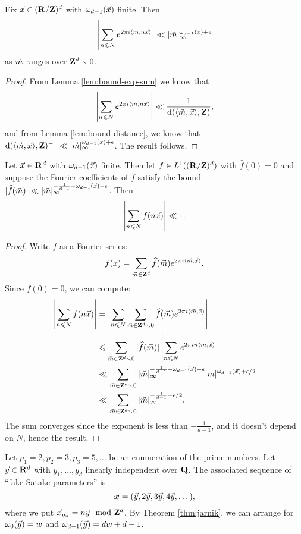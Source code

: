 \begin{theorem}
Fix $\vec{x}\in (\mathbf{R}/\mathbf{Z})^d$ with $\omega_{d-1}(\vec{x})$ finite. Then 
\[
	\left| \sum_{n\leqslant N} e^{2\pi i \langle \vec{m}, n \vec{x}\rangle}\right| \ll |\vec{m}|_\infty^{\omega_{d-1}(\vec{x}) + \epsilon} 
\]
as $\vec{m}$ ranges over $\mathbf{Z}^d\smallsetminus 0$. 
\end{theorem}
\begin{proof}
From Lemma \ref{lem:bound-exp-sum} we know that 
\[
	\left| \sum_{n\leqslant N} e^{2\pi i \langle \vec{m}, n \vec{x}\rangle}\right| \ll \frac{1}{\mathrm{d}(\langle \vec{m}, \vec{x}\rangle,\mathbf{Z})} ,
\]
and from Lemma \ref{lem:bound-distance}, we know that 
$\mathrm{d}(\langle \vec{m},\vec{x}\rangle, \mathbf{Z})^{-1} \ll |\vec{m}|_\infty^{\omega_{d-1}(x)+\epsilon}$. 
The result follows. 
\end{proof}

\begin{theorem}
Let $\vec{x}\in \mathbf{R}^d$ with $\omega_{d-1}(\vec{x})$ finite. Then let 
$f\in L^1((\mathbf{R}/\mathbf{Z})^d)$ with $\widehat f(0)=0$ and suppose the Fourier 
coefficients of $f$ satisfy the bound 
$|\widehat f(\vec{m})| \ll |\vec{m}|_\infty^{-\frac{1}{d-1} - \omega_{d-1}(\vec{x})-\epsilon}$. 
Then 
\[
	\left| \sum_{n\leqslant N} f(n \vec{x})\right| \ll 1. 
\]
\end{theorem}
\begin{proof}
Write $f$ as a Fourier series:
\[
	f(x) = \sum_{\vec{m}\in \mathbf{Z}^d} \widehat f(\vec{m}) e^{2\pi i \langle \vec{m},\vec{x}\rangle} .
\]
Since $\widehat f(0)=0$, we can compute:
\begin{align*}
	\left| \sum_{n\leqslant N} f(n \vec{x})\right| 
		&= \left| \sum_{n\leqslant N} \sum_{\vec{m}\in \mathbf{Z}^d\smallsetminus 0} \widehat f(\vec{m}) e^{2\pi i \langle \vec{m},\vec{x}\rangle}\right| \\
		&\leqslant \sum_{\vec{m}\in \mathbf{Z}^d\smallsetminus 0} |\widehat f(\vec{m})| \left| \sum_{n\leqslant N} e^{2\pi i n \langle \vec{m},\vec{x}\rangle}\right| \\
		&\ll \sum_{\vec{m}\in \mathbf{Z}^d\smallsetminus 0} |\vec{m}|_\infty^{-\frac{1}{d-1} - \omega_{d-1}(\vec{x}) - \epsilon} |m|^{\omega_{d-1}(\vec{x}) + \epsilon/2} \\
		&\ll \sum_{\vec{m}\in \mathbf{Z}^d\smallsetminus 0} |\vec{m}|_\infty^{-\frac{1}{d-1} - \epsilon/2} .
\end{align*}
The sum converges since the exponent is less than $-\frac{1}{d-1}$, and it 
doesn't depend on $N$, hence the result. 
\end{proof}


Let $p_1 = 2, p_2 = 3, p_3 = 5, \dots$ be an enumeration of the prime numbers. 
Let $\vec{y}\in \mathbf{R}^d$ with $y_1,\dots,y_d$ linearly independent over $\mathbf{Q}$. The 
associated sequence of ``fake Satake parameters'' is 
\[
	{\boldsymbol x} = (\vec{y}, 2\vec{y}, 3 \vec{y}, 4 \vec{y}, \dots) ,
\]
where we put $\vec{x}_{p_n} = n \vec{y}\mod {\mathbf{Z}}^d$. By Theorem \ref{thm:jarnik}, we can 
arrange for $\omega_0(\vec{y}) = w$ and $\omega_{d-1}(\vec{y}) = d w + d - 1$. 

